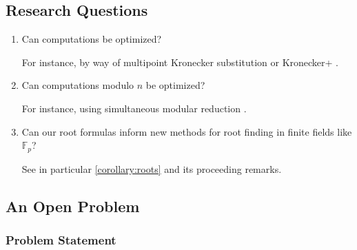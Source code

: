 \documentclass[11pt,reqno]{article}
\theoremstyle{plain}
\theoremstyle{definition}
\begin{document}
\subsection{Research Questions}
\begin{enumerate}
    \item Can computations be optimized?
    
    For instance, by way of multipoint Kronecker substitution or Kronecker+ \cite{harvey2009kronecker, bos2020postquantum}.
    
    \item Can computations modulo $n$ be optimized?
    
    For instance, using simultaneous modular reduction \cite{dumas2011simulataneous}.
    
    \item Can our root formulas inform new methods for root finding in finite fields like $\mathbb{F}_p$?
    
    See  in particular \cref{corollary:roots} and its proceeding remarks.
\end{enumerate}

\subsection{An Open Problem}
\subsubsection{Problem Statement}
\end{document}
